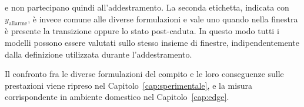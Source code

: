 e non partecipano quindi all'addestramento. La seconda etichetta, indicata con $y_{\text{allarme}}$, è invece comune alle diverse formulazioni e vale uno quando nella finestra è presente la transizione oppure lo stato post-caduta. In questo modo tutti i modelli possono essere valutati sullo stesso insieme di finestre, indipendentemente dalla definizione utilizzata durante l'addestramento.

Il confronto fra le diverse formulazioni del compito e le loro conseguenze sulle prestazioni viene ripreso nel Capitolo~\ref{cap:sperimentale}, e la misura corrispondente in ambiente domestico nel Capitolo~\ref{cap:edge}.


%
%
%
%
%
%
%
%
